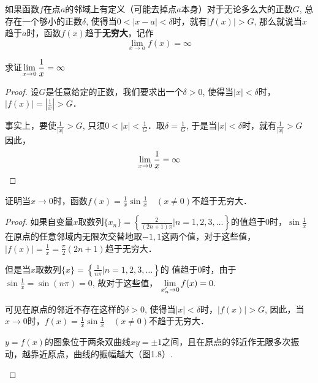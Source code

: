 如果函数$f$在点$a$的邻域上有定义（可能去掉点$a$本身）对于无论多么大的正数$G$, 总存在一个够小的正数$\delta$, 使得当$0<|x-a|<\delta$时，就有$|f(x)|>G$, 那么就说当$x$趋于$a$时，函数$f(x)$趋于\textbf{无穷大}，记作
\[\lim_{x\to a} f (x) =\infty\]

\begin{example}
    求证$\displaystyle\lim_{x\to 0}\dfrac{1}{x}=\infty$
\end{example}
   
\begin{proof}
设$G$是任意给定的正数，我们要求出一个$\delta>0$, 使得当$|x|<\delta$时，$|f(x)|=\left|\frac{1}{x}\right|>G$．

事实上，要使$\frac{1}{|x|}>G$, 
只须$0<|x|<\frac{1}{G} $．取$\delta=\frac{1}{G}$, 于是当$|x|<\delta$时，就有$\frac{1}{|x|}>G$
因此，
$$\displaystyle\lim_{x\to 0}\dfrac{1}{x}=\infty$$
\end{proof}

\begin{example}
    证明当$x\to 0$时，函数$f(x)=\frac{1}{x}\sin\frac{1}{x}\quad (x\ne 0)$不趋于无穷大．
\end{example}

\begin{proof}
如果自变量$x$取数列$\{x_n\}=\left\{\frac{2}{(2n+1)\pi}\Big|n=1, 2, 3,\ldots\right\}$的值趋于0时，$\sin\frac{1}{x}$在原点的任意邻域内无限次交替地取$-1, 1$这两个值，对于这些值，$|f(x)|=\frac{1}{x}=\frac{\pi}{2}(2n+1)$趋于无穷大．

但是当$x$取数列$\{x\}=\left\{\frac{1}{n\pi}\Big| n=1, 2, 3,\ldots\right\}$的
值趋于0时，由于
$\sin\frac{1}{x}=\sin (n\pi) =0$, 
故对于这些值，
$\displaystyle\lim_{x'_n\to 0} f (x) =0$.

可见在原点的邻近不存在这样的$\delta>0$, 使得当$|x|<\delta$时，$|f(x)|>G$, 因此，当$x\to 0$时，$f(x)=\frac{1}{x}\sin\frac{1}{x}\quad (x\ne 0)$不趋于无穷大．

$y=f(x)$的图象位于两条双曲线$xy=\pm 1$之间，且在原点的邻近作无限多次振动，越靠近原点，曲线的振幅越大（图1.8）.

\begin{figure}[htp]
    \centering
{}
    \caption{}
\end{figure}

\end{proof}

